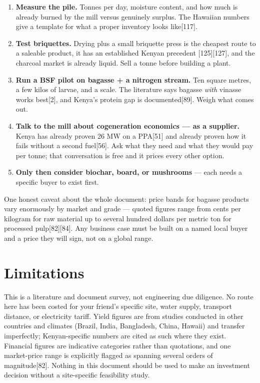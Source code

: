 \documentclass[11pt]{article}
\newcommand{\src}[1]{[#1]}
\begin{document}
\begin{enumerate}[leftmargin=1.4em,itemsep=0.35em]
\item \textbf{Measure the pile.} Tonnes per day, moisture content, and how much
is already burned by the mill versus genuinely surplus. The Hawaiian numbers
give a template for what a proper inventory looks like\src{117}.
\item \textbf{Test briquettes.} Drying plus a small briquette press is the
cheapest route to a saleable product, it has an established Kenyan precedent
\src{125}\src{127}, and the charcoal market is already liquid. Sell a tonne
before building a plant.
\item \textbf{Run a BSF pilot on bagasse + a nitrogen stream.} Ten square
metres, a few kilos of larvae, and a scale. The literature says bagasse
\emph{with} vinasse works best\src{2}, and Kenya's protein gap is
documented\src{89}. Weigh what comes out.
\item \textbf{Talk to the mill about cogeneration economics --- as a supplier.}
Kenya has already proven 26 MW on a PPA\src{51} and already proven how it
fails without a second fuel\src{56}. Ask what they need and what they would pay
per tonne; that conversation is free and it prices every other option.
\item \textbf{Only then consider biochar, board, or mushrooms} --- each needs a
specific buyer to exist first.
\end{enumerate}

One honest caveat about the whole document: price bands for bagasse products
vary enormously by market and grade --- quoted figures range from cents per
kilogram for raw material up to several hundred dollars per metric ton for
processed pulp\src{82}\src{84}. Any business case must be built on a named local
buyer and a price they will sign, not on a global range.

\section*{Limitations}

This is a literature and document survey, not engineering due diligence. No
route here has been costed for your friend's specific site, water supply,
transport distance, or electricity tariff. Yield figures are from studies
conducted in other countries and climates (Brazil, India, Bangladesh, China,
Hawaii) and transfer imperfectly; Kenyan-specific numbers are cited as such
where they exist. Financial figures are indicative categories rather than
quotations, and one market-price range is explicitly flagged as spanning
several orders of magnitude\src{82}. Nothing in this document should be used to
make an investment decision without a site-specific feasibility study.
\end{document}
